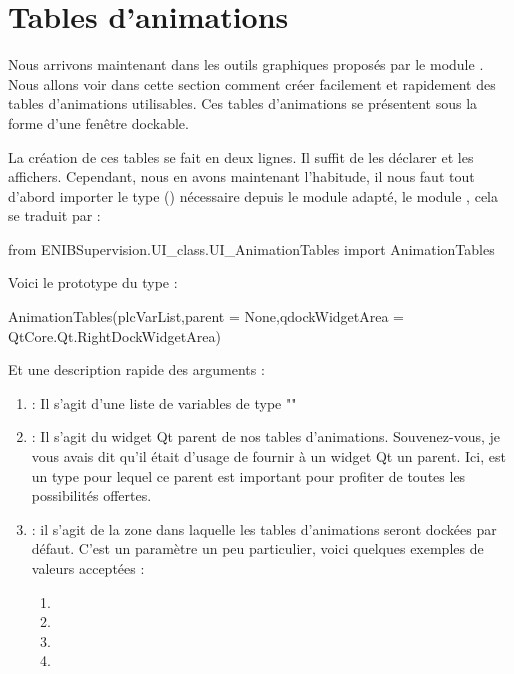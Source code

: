 \documentclass[12pt]{report}    %
\begin{document}
\section{Tables d'animations}

Nous arrivons maintenant dans les outils graphiques proposés par le module .\newline
Nous allons voir dans cette section comment créer facilement et rapidement des tables d'animations utilisables.\newline
Ces tables d'animations se présentent sous la forme d'une fenêtre dockable.\smallSkip

La création de ces tables se fait en deux lignes. Il suffit de les déclarer et les affichers.\newline
Cependant, nous en avons maintenant l'habitude, il nous faut tout d'abord importer le type () nécessaire depuis le module adapté, le module , cela se traduit par :
\begin{pyCode}
from ENIBSupervision.UI_class.UI_AnimationTables import AnimationTables
\end{pyCode}
\smallSkip

Voici le prototype du type  :
\begin{pyCode}
AnimationTables(plcVarList,parent = None,qdockWidgetArea = QtCore.Qt.RightDockWidgetArea)
\end{pyCode}
Et une description rapide des arguments :
\begin{enumerate}
    \item {} : Il s'agit d'une liste de variables de type ""
    \item {} : Il s'agit du widget Qt parent de nos tables d'animations. Souvenez-vous, je vous avais dit qu'il était d'usage de fournir à un widget Qt un parent. Ici,  est un type pour lequel ce parent est important pour profiter de toutes les possibilités offertes.
    \item {} : il s'agit de la zone dans laquelle les tables d'animations seront dockées par défaut. C'est un paramètre un peu particulier, voici quelques exemples de valeurs acceptées :
    \begin{enumerate}
        \item {}
        \item {}
        \item {}
        \item {}
    \end{enumerate}
\end{enumerate}
\smallSkip
\end{document}
